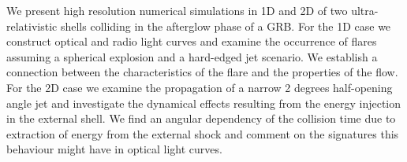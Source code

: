 


\bigskip



\bigskip

\noindent We present high resolution numerical simulations in 1D and 2D of two ultra-relativistic shells colliding in the afterglow phase of a GRB. For the 1D case we construct optical and radio light curves and examine the occurrence of flares assuming a spherical explosion and a hard-edged jet scenario. We establish a connection between the characteristics of the flare and the properties of the flow. For the 2D case we examine the propagation of a narrow 2 degrees half-opening angle jet and investigate the dynamical effects resulting from the energy injection in the external shell. We find an angular dependency of the collision time due to extraction of energy from the external shock and comment on the signatures this behaviour might have in optical light curves.
